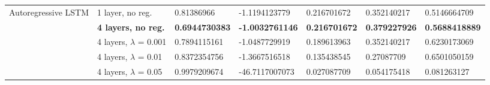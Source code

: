 \documentclass[pdftex,10pt,a4paper,journal]{article}
\theoremstyle{definition}
\theoremstyle{remark}
\begin{document}
{\begin{landscape}
\begin{tabular}{|l|l|l|l|l|l|l|}
\multirow{5}{*}{Autoregressive LSTM}  & 1 layer, no reg.            & 0.81386966            & -1.1194123779          & 0.216701672           & 0.352140217          & 0.5146664709           \\ \cline{2-7} 
                                      & \textbf{4 layers, no reg.}  & \textbf{0.6944730383} & \textbf{-1.0032761146} & \textbf{0.216701672}  & \textbf{0.379227926} & \textbf{0.5688418889}  \\ \cline{2-7} 
                                      & 4 layers, $\lambda$ = 0.001 & 0.7894115161          & -1.0487729919          & 0.189613963           & 0.352140217          & 0.6230173069           \\ \cline{2-7} 
                                      & 4 layers, $\lambda$ = 0.01  & 0.8372354756          & -1.3667516518          & 0.135438545           & 0.27087709           & 0.6501050159           \\ \cline{2-7} 
                                      & 4 layers, $\lambda$ = 0.05  & 0.9979209674          & -46.7117007073         & 0.027087709           & 0.054175418          & 0.081263127            \\ \hline
\end{tabular}
\label{tab:laser}


\end{landscape}}
\end{document}
